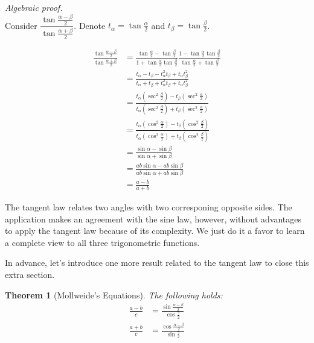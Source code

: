 \documentclass[12pt]{article}
\newtheorem*{theorem}{Theorem}
\renewenvironment{proof}[1][Proof]{\begin{snugshade*} \textit{{#1}.}\\}{\hfill \qedsymbol \end{snugshade*}}
\begin{document}
    \begin{proof}[Algebraic proof]
        Consider $\dfrac{\tan{\frac{\alpha-\beta}{2}}}{\tan{\frac{\alpha+\beta}{2}}}$. Denote $t_\alpha = \tan{\frac{\alpha}{2}}$ and $t_\beta = \tan{\frac{\beta}{2}}$.

        \begin{align*}
            \frac{\tan{\frac{\alpha-\beta}{2}}}{\tan{\frac{\alpha+\beta}{2}}}&=\frac{\tan{\frac{\alpha}{2}}-\tan{\frac{\beta}{2}}}{1+\tan{\frac{\alpha}{2}}\tan{\frac{\beta}{2}}}\frac{1-\tan{\frac{\alpha}{2}}\tan{\frac{\beta}{2}}}{\tan{\frac{\alpha}{2}}+\tan{\frac{\beta}{2}}}\\
            &=\frac{t_\alpha - t_\beta - t_\alpha^2t_\beta+t_\alpha t_\beta^2}{t_\alpha + t_\beta + t_\alpha^2t_\beta+t_\alpha t_\beta^2}\\
            &=\frac{t_\alpha(\sec^2{\frac{\beta}{2}})-t_\beta(\sec^2{\frac{\alpha}{2}})}{t_\alpha(\sec^2{\frac{\beta}{2}})+t_\beta(\sec^2{\frac{\alpha}{2}})}\\
            &=\frac{t_\alpha(\cos^2{\frac{\alpha}{2}})-t_\beta(\cos^2{\frac{\beta}{2}})}{t_\alpha(\cos^2{\frac{\alpha}{2}})+t_\beta(\cos^2{\frac{\beta}{2}})}\\
            &=\frac{\sin{\alpha}-\sin{\beta}}{\sin{\alpha}+\sin{\beta}}\\
            &=\frac{ab\sin{\alpha}-ab\sin{\beta}}{ab\sin{\alpha}+ab\sin{\beta}}\\
            &=\frac{a-b}{a+b}
        \end{align*}
    \end{proof}

    The tangent law relates two angles with two corresponing opposite sides. The application makes an agreement with the sine law, however, without advantages to apply the tangent law because of its complexity. We just do it a favor to learn a complete view to all three trigonometric functions.

    In advance, let's introduce one more result related to the tangent law to close this extra section.

    \begin{theorem}[Mollweide's Equations]
        The following holds:\begin{align}
            \frac{a-b}{c}&=\frac{\sin{\frac{\alpha-\beta}{2}}}{\cos{\frac{\gamma}{2}}}\\
            \frac{a+b}{c}&=\frac{\cos{\frac{\alpha-\beta}{2}}}{\sin{\frac{\gamma}{2}}}
        \end{align}
    \end{theorem}
\end{document}
